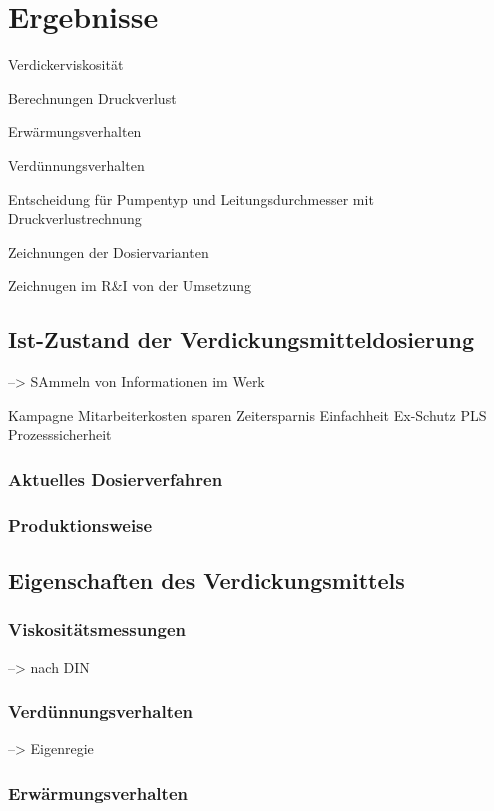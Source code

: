 \section{Ergebnisse}
\label{sec:ergebnisse}

Verdickerviskosität

Berechnungen Druckverlust

Erwärmungsverhalten

Verdünnungsverhalten

Entscheidung für Pumpentyp und Leitungsdurchmesser mit Druckverlustrechnung 

Zeichnungen der Dosiervarianten

Zeichnugen im R\&I von der Umsetzung


\subsection{Ist-Zustand der Verdickungsmitteldosierung}
--> SAmmeln von Informationen im Werk

Kampagne
Mitarbeiterkosten sparen
Zeitersparnis
Einfachheit
Ex-Schutz
PLS
Prozesssicherheit

\subsubsection{Aktuelles Dosierverfahren}
\subsubsection{Produktionsweise}

\subsection{Eigenschaften des Verdickungsmittels}

\subsubsection{Viskositätsmessungen}
--> nach DIN

\subsubsection{Verdünnungsverhalten}
--> Eigenregie

\subsubsection{Erwärmungsverhalten}

